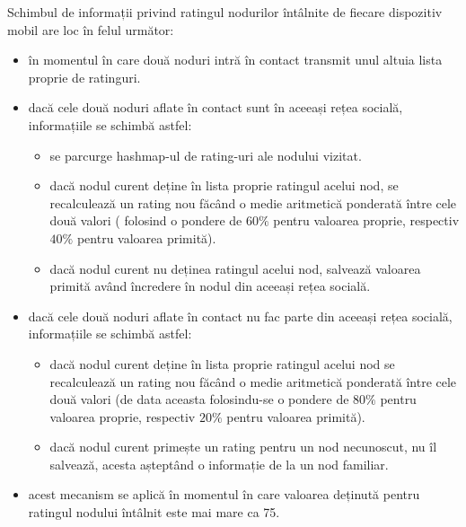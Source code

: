 \documentclass[12pt,a4paper]{report}
\begin{document}
Schimbul de informații privind ratingul nodurilor întâlnite de fiecare dispozitiv mobil are loc în felul următor:
\begin{itemize}
	\item în momentul în care două noduri intră în contact transmit unul altuia lista proprie de ratinguri.
	\item dacă cele două noduri aflate în contact sunt în aceeași rețea socială, informațiile se schimbă astfel:
	\begin{itemize}
		\item se parcurge hashmap-ul de rating-uri ale nodului vizitat.
		\item dacă nodul curent deține în lista proprie ratingul acelui nod, se recalculează un rating nou făcând o medie aritmetică ponderată între cele două valori ( folosind o pondere de $60\%$ pentru valoarea proprie, respectiv $40\%$ pentru valoarea primită).
		\item dacă nodul curent nu deținea ratingul acelui nod, salvează valoarea primită având încredere în nodul din aceeași rețea socială.
	\end{itemize}
	\item dacă cele două noduri aflate în contact nu fac parte din aceeași rețea socială, informațiile se schimbă astfel:
		\begin{itemize}
			\item dacă nodul curent deține în lista proprie ratingul acelui nod se recalculează un rating nou făcând o medie aritmetică ponderată între cele două valori (de data aceasta folosindu-se o pondere de $80\%$ pentru valoarea proprie, respectiv $20\%$ pentru valoarea primită).
			\item dacă nodul curent primește un rating pentru un nod necunoscut, nu îl salvează, acesta așteptând o informație de la un nod familiar.
		\end{itemize}
	\item acest mecanism se aplică în momentul în care valoarea deținută pentru ratingul nodului întâlnit este mai mare ca 75.
\end{itemize}
\end{document}
